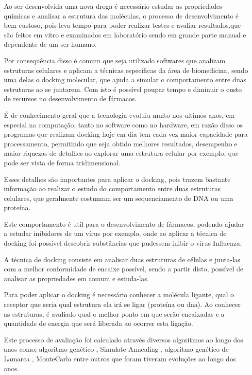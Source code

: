 \documentclass[tcc, capa]{texucpel}
\begin{document}
Ao ser desenvolvida uma nova droga é necessário estudar as propriedades químicas e analisar a estrutura das moléculas, o processo de desenvolvimento é bem custoso, pois leva tempo para poder realizar testes e avaliar resultados,que são feitos em vitro e examinados em laboratório sendo em grande parte manual e dependente de um ser humano.%

Por consequência disso é comum que seja utilizado softwares que analizam estruturas celulares e aplicam a técnicas específicas da área de biomedicina, sendo uma delas o docking molecular, que ajuda a simular o comportamento entre duas estruturas ao se juntarem.
Com isto é possível poupar tempo e diminuir o custo de recursos no desenvolvimento de fármacos.

É de conhecimento geral que a tecnologia evoluiu muito nos ultimos anos, em especial na computação, tanto no software como no hardware,  em razão disso os programas que realizam docking hoje em dia tem cada vez maior capacidade para processamento, permitindo que seja obtido melhores resultados, desempenho e maior riquezas de detalhes ao explorar uma estrutura celular por exemplo, que pode ser vista de forma tridimensional.

Esses detalhes são importantes para aplicar o docking, pois trazem bastante informação ao realizar o estudo do comportamento entre duas estruturas celulares, que geralmente costumam ser um sequenciamento de DNA ou uma proteína.%

Este comportamento é util para o desenvolvimento de fármacos, podendo ajudar a estudar inibidores de um vírus por exemplo,  onde ao aplicar a técnica de docking foi possível descobrir substâncias que pudessem inibir o vírus Influenza\cite{ishikawa2011binding}.

A técnica de docking consiste em analisar duas estruturas de células e junta-las com a melhor conformidade de encaixe possível, sendo a partir disto, possível de analisar as propriedades em comum e estuda-las.

Para poder aplicar o docking é necessário conhecer a molécula ligante, qual o receptor que seria qual estrutura ela irá se ligar (proteína ou dna). Ao conhecer as estruturas, é avaliado qual o melhor ponto em que serão encaixadas e a quantidade de energia que será liberada ao ocorrer esta ligação.

Este processo de avaliação foi calculado através diversos algoritmos ao longo dos anos como; algoritmo genético \cite{holland1975adaptation}, Simulate Annealing \cite{kirkpatrick1984optimization} ,  algoritmo genético de Lamarca \cite{morris1998automated},  MonteCarlo \cite{caflisch1992monte} entre outros que foram tiveram evoluções ao longo dos anos. 
\end{document}
